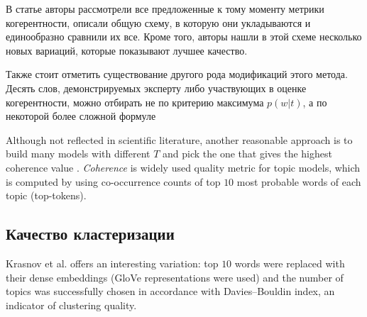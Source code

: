 В статье \cite{roder2015exploring} авторы рассмотрели все предложенные к тому моменту метрики когерентности, описали общую схему, в которую они укладываются и единообразно сравнили их все. Кроме того, авторы нашли в этой схеме несколько новых вариаций, которые показывают лучшее качество. 

Также стоит отметить существование другого рода модификаций этого метода. Десять слов, демонстрируемых эксперту либо участвующих в оценке когерентности, можно отбирать не по критерию максимума $p(w|t)$, а по некоторой более сложной формуле \cite{blei2009topic} \cite{ldavis2014}




Although not reflected in scientific literature, another reasonable approach is to build many models with different $T$ and pick the one that gives the highest coherence value \cite{mlplus}\cite{sathi2016quality}\cite{del2020emerging}. \textit{Coherence} is widely used quality metric for topic models, which is computed by using co-occurrence counts of top $10$ most probable words of each topic (top-tokens).


\subsection{Качество кластеризации}

Krasnov et al.\cite{krasnov19clustering} offers an interesting variation: top $10$ words were replaced with their dense embeddings (GloVe representations were used) and the number of topics was successfully chosen in accordance with Davies–Bouldin index, an indicator of clustering quality.





